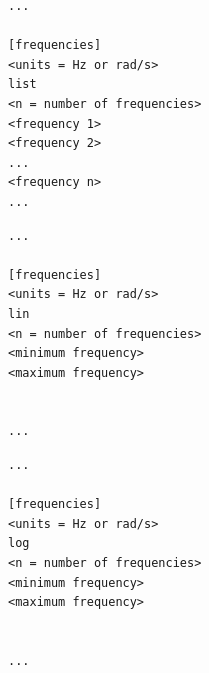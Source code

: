 \documentclass[a4paper,fleqn]{book}
\begin{document}
\begin{center}
\begin{minipage}{0.3\textwidth}
\begin{Verbatim}[frame=single, fontsize=\small, label=input.dat]
...

[frequencies]
<units = Hz or rad/s>
list
<n = number of frequencies>
<frequency 1>
<frequency 2>
...
<frequency n>
...
\end{Verbatim}
\end{minipage}
\begin{minipage}{0.3\textwidth}
\begin{Verbatim}[frame=single, fontsize=\small, label=input.dat]
...

[frequencies]
<units = Hz or rad/s>
lin
<n = number of frequencies>
<minimum frequency>
<maximum frequency>


...
\end{Verbatim}
\end{minipage}
\begin{minipage}{0.3\textwidth}
\begin{Verbatim}[frame=single, fontsize=\small, label=input.dat]
...

[frequencies]
<units = Hz or rad/s>
log
<n = number of frequencies>
<minimum frequency>
<maximum frequency>


...
\end{Verbatim}
\end{minipage}
\end{center}
\end{document}
